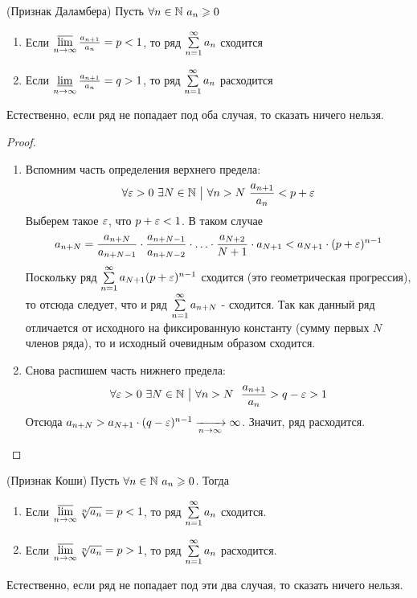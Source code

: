 \begin{theorem} (Признак Даламбера)
	Пусть $\forall n \in \mathbb{N}\ a_n \geqslant 0$
	\begin{enumerate}
		\item Если $\varlimsup\limits_{n \to \infty} \frac{a_{n + 1}}{a_n} = p < 1$, то ряд $\sum\limits_{n = 1}^\infty a_n$ сходится
		
		\item Если $\varliminf\limits_{n \to \infty} \frac{a_{n + 1}}{a_n} = q > 1$, то ряд $\sum\limits_{n = 1}^\infty a_n$ расходится
	\end{enumerate}
	Естественно, если ряд не попадает под оба случая, то сказать ничего нельзя.
\end{theorem}

\begin{proof}~
	\begin{enumerate}
		\item Вспомним часть определения верхнего предела:
		\[
			\forall \varepsilon > 0\ \exists N \in \mathbb{N} \ \big|\  \forall n > N\ \frac{a_{n + 1}}{a_n} < p + \varepsilon
		\]
		Выберем такое $\varepsilon$, что $p + \varepsilon < 1$. В таком случае
		\[
			a_{n + N} = \frac{a_{n + N}}{a_{n + N - 1}} \cdot \frac{a_{n + N - 1}}{a_{n + N - 2}} \cdot \ldots \cdot \frac{a_{N + 2}}{N + 1} \cdot a_{N + 1} < a_{N + 1} \cdot (p + \varepsilon)^{n - 1}
		\]
		Поскольку ряд $\sum\limits_{n = 1}^\infty a_{N + 1}(p + \varepsilon)^{n - 1}$ сходится (это геометрическая прогрессия), то отсюда следует, что и ряд $\sum\limits_{n = 1}^\infty a_{n + N}$ - сходится. Так как данный ряд отличается от исходного на фиксированную константу (сумму первых $N$ членов ряда), то и исходный очевидным образом сходится.
		
		\item Снова распишем часть нижнего предела:
		\[
			\forall \varepsilon > 0\ \exists N \in \mathbb{N} \ \big|\  \forall n > N\ \ \frac{a_{n + 1}}{a_n} > q - \varepsilon > 1
		\]
		Отсюда $a_{n + N} > a_{N + 1} \cdot (q - \varepsilon)^{n - 1} \xrightarrow[n \to \infty]{} \infty$. Значит, ряд расходится.
	\end{enumerate}
\end{proof}

\begin{theorem} (Признак Коши)
	Пусть $\forall n \in \mathbb{N}\ a_n \geqslant 0$. Тогда
	\begin{enumerate}
		\item Если $\varlimsup\limits_{n \to \infty} \sqrt[n]{a_n} = p < 1$, то ряд $\sum\limits_{n = 1}^\infty a_n$ сходится.
		
		\item Если $\varlimsup\limits_{n \to \infty} \sqrt[n]{a_n} = p > 1$, то ряд $\sum\limits_{n = 1}^\infty a_n$ расходится.
	\end{enumerate}
	Естественно, если ряд не попадает под эти два случая, то сказать ничего нельзя.
\end{theorem}

